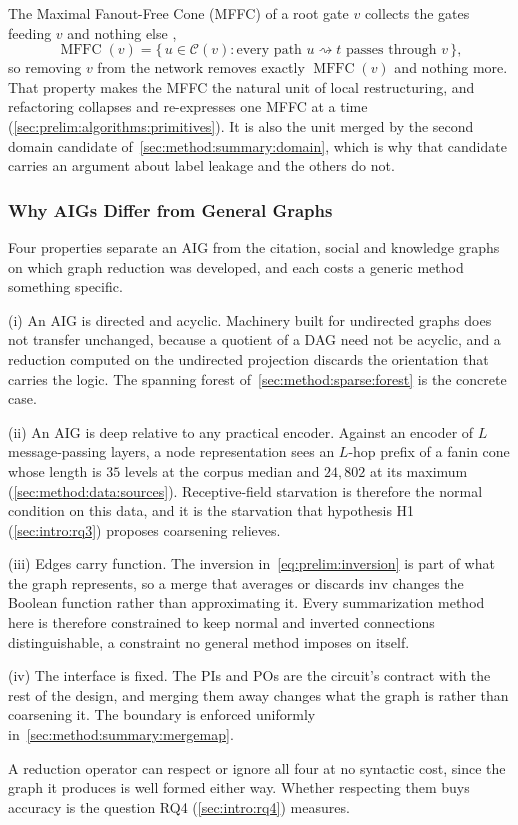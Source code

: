 The Maximal Fanout-Free Cone (MFFC) of a root gate $v$ collects the gates feeding $v$ and
nothing else \citep{mishchenko2006rewriting},
\begin{equation}
    \operatorname{MFFC}(v) = \{\, u \in \mathcal{C}(v) :
        \text{every path } u \rightsquigarrow t \text{ passes through } v \,\},
    \label{eq:prelim:mffc}
\end{equation}
so removing $v$ from the network removes exactly $\operatorname{MFFC}(v)$ and nothing more.
That property makes the MFFC the natural unit of local restructuring, and refactoring
collapses and re-expresses one MFFC at a time
(\ref{sec:prelim:algorithms:primitives}). It is also the unit merged by the second domain
candidate of~\ref{sec:method:summary:domain}, which is why that candidate carries an argument
about label leakage and the others do not.

\subsubsection{Why AIGs Differ from General Graphs}
\label{sec:prelim:aig:distinct}
Four properties separate an AIG from the citation, social and knowledge graphs on which graph
reduction was developed, and each costs a generic method something specific.

(i) An AIG is directed and acyclic. Machinery built for undirected graphs does not transfer
unchanged, because a quotient of a DAG need not be acyclic, and a reduction computed on the
undirected projection discards the orientation that carries the logic. The spanning forest
of~\ref{sec:method:sparse:forest} is the concrete case.

(ii) An AIG is deep relative to any practical encoder. Against an encoder of $L$
message-passing layers, a node representation sees an $L$-hop prefix of a fanin cone whose
length is $35$ levels at the corpus median and $24{,}802$ at its maximum
(\ref{sec:method:data:sources}). Receptive-field starvation is therefore the normal condition
on this data, and it is the starvation that hypothesis H1 (\ref{sec:intro:rq3}) proposes
coarsening relieves.

(iii) Edges carry function. The inversion in~\eqref{eq:prelim:inversion} is part of what the
graph represents, so a merge that averages or discards $\mathrm{inv}$ changes the Boolean function rather
than approximating it. Every summarization method here is therefore constrained to keep
normal and inverted connections distinguishable, a constraint no general method imposes on
itself.

(iv) The interface is fixed. The PIs and POs are the circuit's contract with the
rest of the design, and merging them away changes what the graph is rather than coarsening
it. The boundary is enforced uniformly in~\ref{sec:method:summary:mergemap}.

A reduction operator can respect or ignore all four at no syntactic cost, since the graph it
produces is well formed either way. Whether respecting them buys accuracy is the question RQ4
(\ref{sec:intro:rq4}) measures.
